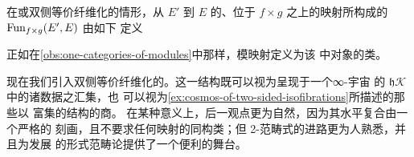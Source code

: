 \begin{observation}\label{obs:functor-space-over-product}
在\trModule{}或双侧等价纤维化的情形，从 $E'$ 到 $E$ 的、位于 $f\times g$
之上的映射所构成的\trFunctorSpace{} $\operatorname{Fun}_{f\times g}(E',E)$ 由如下\trPullback%
定义
\begin{center}
\end{center}
正如在\cref{obs:one-categories-of-modules}中那样，模映射定义为该%
\trFunctorSpace{}中对象的\trIsomorphism{}类。
\end{observation}

现在我们引入双侧等价纤维化的\trDoubleCategory{}。这一结构既可以视为呈现于一个∞-宇宙
的\trHomotopyTwoCategory{} $\mathfrak{h}\mathcal{K}$ 中的诸数据之汇集，也
可以视为\cref{ex:cosmos-of-two-sided-isofibrations}所描述的那些以%
\trQuasiCategory{}富集的结构的商。
在某种意义上，后一观点更为自然，因为其水平复合由一个严格的\trUniversalProperty%
刻画，且不要求任何映射的同构类；但 2-范畴式的进路更为人熟悉，并且为发展%
\trInfinityCategories{}的形式范畴论提供了一个便利的舞台。

